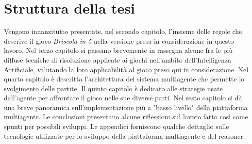 \section{Struttura della tesi}

Vengono innanzitutto presentate, nel secondo capitolo, l'insieme delle regole che descrive il gioco \emph{Briscola in 5} nella versione presa in considerazione in questo lavoro.
Nel terzo capitolo si passano brevemente in rassegna alcune fra le più diffuse tecniche di risoluzione applicate ai giochi nell'ambito dell'Intelligenza Artificiale, valutando la loro applicabilità al gioco preso qui in considerazione.
Nel quarto capitolo è descritta l'architettura del sistema multiagente che permette lo svolgimento delle partite.
Il quinto capitolo è dedicato alle strategie usate dall'agente per affrontare il gioco nelle sue diverse parti.
Nel sesto capitolo si dà una breve panoramica sull'implementazione più a "basso livello" della piattaforma multiagente.
Le conclusioni presentano alcune riflessioni sul lavoro fatto così come spunti per possibili sviluppi.
Le appendici forniscono qualche dettaglio sulle tecnologie utilizzate per lo sviluppo della piattaforma multiagente e del reasoner.
